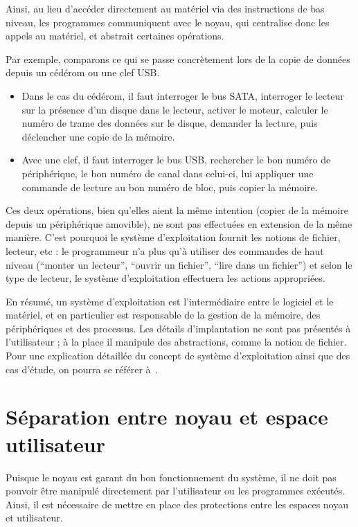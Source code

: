 Ainsi, au lieu d'accéder directement au matériel via des instructions de bas
niveau, les programmes communiquent avec le noyau, qui centralise donc les
appels au matériel, et abstrait certaines opérations.

Par exemple, comparons ce qui se passe concrètement lors de la copie de données
depuis un cédérom ou une clef USB.

\begin{itemize}

  \item Dans le cas du cédérom, il faut interroger le bus SATA, interroger le
    lecteur sur la présence d'un disque dans le lecteur, activer le moteur,
    calculer le numéro de trame des données sur le disque, demander la lecture,
    puis déclencher une copie de la mémoire.

  \item Avec une clef, il faut interroger le bus USB, rechercher le bon numéro
    de périphérique, le bon numéro de canal dans celui-ci, lui appliquer une
    commande de lecture au bon numéro de bloc, puis copier la mémoire.

\end{itemize}

Ces deux opérations, bien qu'elles aient la même intention (copier de la mémoire
depuis un périphérique amovible), ne sont pas effectuées en extension de la même
manière. C'est pourquoi le système d'exploitation fournit les notions de
fichier, lecteur, etc : le programmeur n'a plus qu'à utiliser des commandes de
haut niveau (``monter un lecteur'', ``ouvrir un fichier'', ``lire dans un
fichier'') et selon le type de lecteur, le système d'exploitation effectuera les
actions appropriées.

En résumé, un système d'exploitation est l'intermédiaire entre le logiciel et le
matériel, et en particulier est responsable de la gestion de la mémoire, des
périphériques et des processus. Les détails d'implantation ne sont pas présentés
à l'utilisateur ; à la place il manipule des abstractions, comme la notion de
fichier. Pour une explication détaillée du concept de système d'exploitation
ainsi que des cas d'étude, on pourra se référer à~\cite{tanenbaum}.

\section{Séparation entre noyau et espace utilisateur}

Puisque le noyau est garant du bon fonctionnement du système, il ne doit pas
pouvoir être manipulé directement par l'utilisateur ou les programmes exécutés.
Ainsi, il est nécessaire de mettre en place des protections entre les espaces
noyau et utilisateur.

